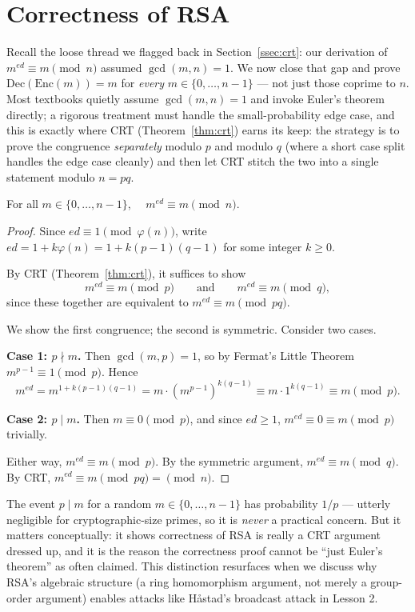 \newpage
\section{Correctness of RSA}\label{sec:correctness}

Recall the loose thread we flagged back in Section~\ref{ssec:crt}: our derivation of $m^{ed}\equiv m\pmod n$ assumed $\gcd(m,n)=1$. We now close that gap and prove $\mathrm{Dec}(\mathrm{Enc}(m)) = m$ for \emph{every} $m \in \{0, \dots, n-1\}$ — not just those coprime to $n$. Most textbooks quietly assume $\gcd(m,n)=1$ and invoke Euler's theorem directly; a rigorous treatment must handle the small-probability edge case, and this is exactly where CRT (Theorem~\ref{thm:crt}) earns its keep: the strategy is to prove the congruence \emph{separately} modulo $p$ and modulo $q$ (where a short case split handles the edge case cleanly) and then let CRT stitch the two into a single statement modulo $n=pq$.

\begin{theorem}
For all $m \in \{0, \dots, n-1\}$, $\quad m^{ed} \equiv m \pmod n$.
\end{theorem}

\begin{proof}
Since $ed \equiv 1 \pmod{\varphi(n)}$, write $ed = 1 + k\varphi(n) = 1 + k(p-1)(q-1)$ for some integer $k \geq 0$.

By CRT (Theorem~\ref{thm:crt}), it suffices to show
\[
m^{ed} \equiv m \pmod p \qquad \text{and} \qquad m^{ed} \equiv m \pmod q,
\]
since these together are equivalent to $m^{ed} \equiv m \pmod{pq}$.

We show the first congruence; the second is symmetric. Consider two cases.

\textbf{Case 1: $p \nmid m$.} Then $\gcd(m, p) = 1$, so by Fermat's Little Theorem $m^{p-1} \equiv 1 \pmod p$. Hence
\[
m^{ed} = m^{1 + k(p-1)(q-1)} = m \cdot \left(m^{p-1}\right)^{k(q-1)} \equiv m \cdot 1^{k(q-1)} \equiv m \pmod p.
\]

\textbf{Case 2: $p \mid m$.} Then $m \equiv 0 \pmod p$, and since $ed \geq 1$, $m^{ed} \equiv 0 \equiv m \pmod p$ trivially.

Either way, $m^{ed} \equiv m \pmod p$. By the symmetric argument, $m^{ed} \equiv m \pmod q$. By CRT, $m^{ed} \equiv m \pmod{pq} = \pmod n$.
\end{proof}

\begin{remark}
The event $p \mid m$ for a random $m \in \{0,\dots,n-1\}$ has probability $1/p$ — utterly negligible for cryptographic-size primes, so it is \emph{never} a practical concern. But it matters conceptually: it shows correctness of RSA is really a CRT argument dressed up, and it is the reason the correctness proof cannot be ``just Euler's theorem'' as often claimed. This distinction resurfaces when we discuss why RSA's algebraic structure (a ring homomorphism argument, not merely a group-order argument) enables attacks like Håstad's broadcast attack in Lesson 2.
\end{remark}


